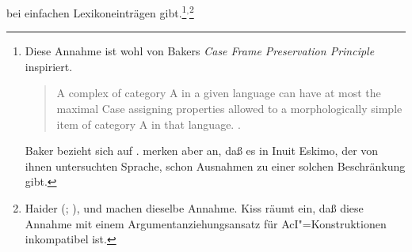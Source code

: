 bei einfachen Lexikoneinträgen gibt.\footnote{
  Diese Annahme ist wohl von Bakers \emph{Case Frame Preservation Principle}
  inspiriert.
  \begin{quote}
    A complex \xnull of category A in a given language can have
    at most the maximal Case assigning properties allowed to a morphologically
    simple item of category A in that language. \citep[]{Baker88a}.
  \end{quote}%
  Baker bezieht sich auf . \citet[]{GM85a} merken aber
  an, daß es in Inuit Eskimo, der von ihnen untersuchten Sprache, schon
  Ausnahmen zu einer solchen Beschränkung gibt.%
}$^,$\footnote{
        Haider (\citeyear[]{Haider86c}; \citeyear[]{Haider90b}),
        \citet[]{Kiss95a} und
        \citet[]{Kathol2000a} machen dieselbe Annahme.
        Kiss räumt ein, daß diese Annahme mit einem Argumentanziehungsansatz für
        AcI"=Konstruktionen inkompatibel ist.

}
